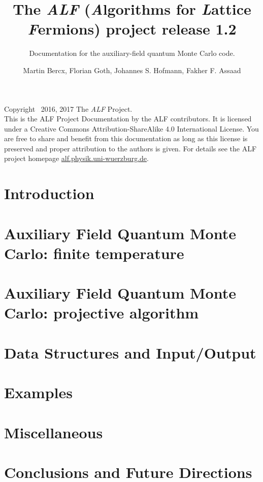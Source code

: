 \documentclass[10pt,Arial]{scrartcl}
\begin{document}
\title{The \emph{ALF} (\emph{A}lgorithms for \emph{L}attice \emph{F}ermions) project release 1.2}

\subtitle{Documentation for the  auxiliary-field quantum Monte Carlo code.}
\author{Martin Bercx,  Florian Goth,  Johannes S. Hofmann, Fakher F. Assaad }
\maketitle

Copyright \textcopyright ~2016, 2017 The \textit{ALF} Project.\\
This is the ALF Project Documentation by the ALF contributors.
It is licensed under a Creative Commons Attribution-ShareAlike 4.0 International License.
You are free to share and benefit from this documentation as long as this license is preserved
and proper attribution to the authors is given. For details see the ALF project
homepage \url{alf.physik.uni-wuerzburg.de}.
\tableofcontents
\clearpage
\section{Introduction}\label{sec:intro}

\section{Auxiliary Field Quantum Monte Carlo: finite temperature }\label{sec:def}





\section{Auxiliary Field Quantum Monte Carlo: projective algorithm }\label{sec:defT0}

\section{Data Structures and Input/Output}\label{sec:imp}





\section{Examples}\label{sec:ex}

\section{Miscellaneous}\label{sec:misc}







\section{Conclusions and Future Directions}\label{sec:con}


 


\end{document}
